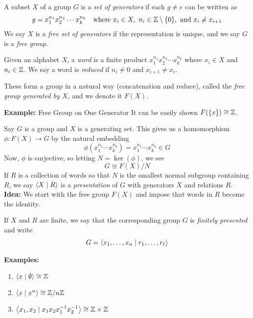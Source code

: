 

\begin{definition}
    A subset $X$ of a group $G$ is a \emph{set of generators} if each $g \neq e$ can be written as
    \[ g = x_1^{n_1}x_2^{n_2}\cdots x_k^{n_k} \quad \text{where } x_i \in X,\ n_i \in \mathbb{Z} \setminus \{0\}, \text{ and } x_i \neq x_{i + 1} \]
    We say $X$ is a \emph{free set of generators} if the representation is unique, and we say $G$ is a \emph{free group}.
\end{definition}

\begin{definition}
    Given an alphabet $X$, a \emph{word} is a finite product $x_1^{n_1}x_2^{n_2}\cdots x_k^{n_k}$ where $x_i \in X$ and $n_i \in \mathbb{Z}$. We say a word is \emph{reduced} if $n_i \neq 0$ and $x_{i + 1} \neq x_i$.
\end{definition}

These form a group in a natural way (concatenation and reduce), called the \emph{free group generated by $X$}, and we denote it $F(X)$.

\begin{example}{\textbf{Example:} Free Group on One Generator}
    It can be easily shown $F(\{x\}) \cong \mathbb{Z}$.
\end{example}

Say $G$ is a group and $X$ is a generating set. This gives us a homomorphism $\phi : F(X) \to G$ by the natural embedding
\[ \phi(x_1^{n_1}\cdots x_k^{n_k}) = x_1^{n_1}\cdots x_k^{n_k} \in G \]
Now, $\phi$ is surjective, so letting $N = \ker(\phi)$, we see
\[ G \cong F(X)/N \]
If $R$ is a collection of words so that $N$ is the smallest normal subgroup containing $R$, we say $\left\langle {X \mid R} \right\rangle$ is a \emph{presentation} of $G$ with generators $X$ and relations $R$.\\

\textbf{Idea:} We start with the free group $F(X)$ and impose that words in $R$ become the identity.

\begin{definition}
    If $X$ and $R$ are finite, we say that the corresponding group $G$ is \emph{finitely presented} and write
    \[ G = \left\langle {x_1, \ldots, x_n \mid r_1, \ldots, r_{\ell}} \right\rangle \]
\end{definition}

\textbf{Examples:}
\begin{enumerate}
    \item $\left\langle {x \mid \emptyset} \right\rangle \cong \mathbb{Z}$
    \item $\left\langle {x \mid x^{n}} \right\rangle \cong \mathbb{Z}/n\mathbb{Z}$
    \item $\left\langle {x_1, x_2 \mid x_1x_2x_1^{-1}x_2^{-1}} \right\rangle \cong \mathbb{Z} \times \mathbb{Z}$
\end{enumerate}


